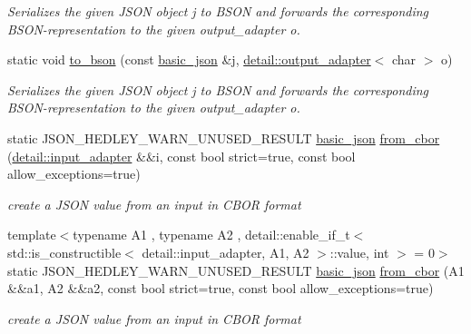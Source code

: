 \begin{DoxyCompactItemize}
\begin{DoxyCompactList}\small\item\em Serializes the given J\+S\+ON object {\ttfamily j} to B\+S\+ON and forwards the corresponding B\+S\+O\+N-\/representation to the given output\+\_\+adapter {\ttfamily o}. \end{DoxyCompactList}\item 
static void \mbox{\hyperlink{classnlohmann_1_1basic__json_aeb988f5b2148875ed1c9cb32bec156c6}{to\+\_\+bson}} (const \mbox{\hyperlink{classnlohmann_1_1basic__json}{basic\+\_\+json}} \&j, \mbox{\hyperlink{classnlohmann_1_1detail_1_1output__adapter}{detail\+::output\+\_\+adapter}}$<$ char $>$ o)
\begin{DoxyCompactList}\small\item\em Serializes the given J\+S\+ON object {\ttfamily j} to B\+S\+ON and forwards the corresponding B\+S\+O\+N-\/representation to the given output\+\_\+adapter {\ttfamily o}. \end{DoxyCompactList}\item 
static J\+S\+O\+N\+\_\+\+H\+E\+D\+L\+E\+Y\+\_\+\+W\+A\+R\+N\+\_\+\+U\+N\+U\+S\+E\+D\+\_\+\+R\+E\+S\+U\+LT \mbox{\hyperlink{classnlohmann_1_1basic__json}{basic\+\_\+json}} \mbox{\hyperlink{classnlohmann_1_1basic__json_a1d568ba1bd6978d80db42aa76626e2cf}{from\+\_\+cbor}} (\mbox{\hyperlink{classnlohmann_1_1detail_1_1input__adapter}{detail\+::input\+\_\+adapter}} \&\&i, const bool strict=true, const bool allow\+\_\+exceptions=true)
\begin{DoxyCompactList}\small\item\em create a J\+S\+ON value from an input in C\+B\+OR format \end{DoxyCompactList}\item 
{\footnotesize template$<$typename A1 , typename A2 , detail\+::enable\+\_\+if\+\_\+t$<$ std\+::is\+\_\+constructible$<$ detail\+::input\+\_\+adapter, A1, A2 $>$\+::value, int $>$  = 0$>$ }\\static J\+S\+O\+N\+\_\+\+H\+E\+D\+L\+E\+Y\+\_\+\+W\+A\+R\+N\+\_\+\+U\+N\+U\+S\+E\+D\+\_\+\+R\+E\+S\+U\+LT \mbox{\hyperlink{classnlohmann_1_1basic__json}{basic\+\_\+json}} \mbox{\hyperlink{classnlohmann_1_1basic__json_a513d6fb63a0ea53ce6c28c05ce0f26e6}{from\+\_\+cbor}} (A1 \&\&a1, A2 \&\&a2, const bool strict=true, const bool allow\+\_\+exceptions=true)
\begin{DoxyCompactList}\small\item\em create a J\+S\+ON value from an input in C\+B\+OR format \end{DoxyCompactList}\item 

\end{DoxyCompactItemize}
